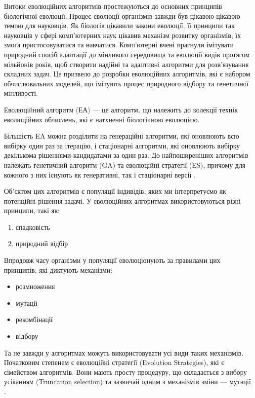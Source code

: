 Витоки еволюційних алгоритмів простежуються до основних принципів 
біологічної еволюції. 
Процес еволюції організмів завжди був цікавою цікавою темою для науковців.
Як біологів цікавили закони еволюції, її принципи так науковців у сфері 
комп'ютерних наук цікавив механізм розвитку організмів, їх змога пристосовуватися
та навчатися.
Комп'ютерні вчені прагнули імітувати природний спосіб 
адаптації до мінливого середовища та еволюції видів протягом 
мільйонів років, щоб створити надійні та адаптивні алгоритми для 
розв'язування складних задач. Це призвело до розробки еволюційних алгоритмів,
які є набором обчислювальних моделей, що імітують процес природного відбору 
та генетичної мінливості.

\begin{definition}
Еволюційний алгоритм (ЕА) --- це алгоритм, що належить до колекції технік 
еволюційних обчислень, які є натхненні біологічною еволюцією.
\end{definition}

Більшість EA можна розділити на генераційні алгоритми, які оновлюють 
всю вибірку один раз за ітерацію, і стаціонарні алгоритми, які 
оновлюють вибірку декількома рішеннями-кандидатами за один раз. 
До найпоширеніших алгоритмів належать генетичний алгоритм (GA) 
та еволюційні стратегії (ES), причому для кожного з них існують 
як генеративні, так і стаціонарні версії \cite{luke_essentials_2013}.

Об'єктом цих алгоритмів є популяції індивідів, яких ми інтерпретуємо 
як потенційні рішення задачі. 
У еволюційних алгоритмах використовуються різні принципи, такі як:
\begin{enumerate}
  \item спадковість
  \item природний відбір
\end{enumerate}

Впродовж часу організми у популяції еволюціонують за правилами цих принципів, які
диктують механізми:
\begin{itemize}
  \item розмноження
  \item мутації
  \item рекомбінації
  \item відбору
\end{itemize}

Та не завжди у алгоритмах можуть використовувати усі види таких механізмів.
Початковим степенем є еволюційні стратегії (Evolution Strategies), які є сімейством
алгоритмів. Вони мають просту процедуру, що складається з вибору
усіканням (Truncation selection) та зазвичай одним
з механізмів зміни --- мутації \cite{luke_essentials_2013}.

